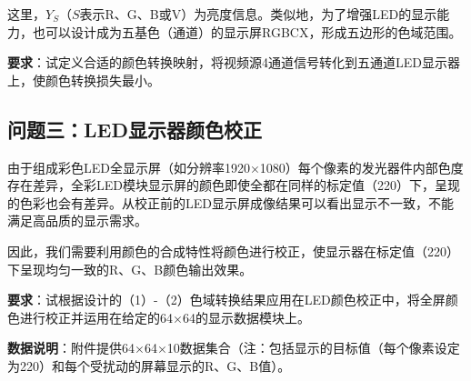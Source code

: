 这里，$Y_S$（$S$表示R、G、B或V）为亮度信息。类似地，为了增强LED的显示能力，也可以设计成为五基色（通道）的显示屏RGBCX，形成五边形的色域范围。

\textbf{要求}：试定义合适的颜色转换映射，将视频源4通道信号转化到五通道LED显示器上，使颜色转换损失最小。

\subsection[\hspace{-2pt}问题三：LED显示器颜色校正]{{\heiti{} \hspace{-8pt}问题三：LED显示器颜色校正}}\label{subsection1: 问题三}

由于组成彩色LED全显示屏（如分辨率1920×1080）每个像素的发光器件内部色度存在差异，全彩LED模块显示屏的颜色即使全都在同样的标定值（220）下，呈现的色彩也会有差异。从校正前的LED显示屏成像结果可以看出显示不一致，不能满足高品质的显示需求。

因此，我们需要利用颜色的合成特性将颜色进行校正，使显示器在标定值（220）下呈现均匀一致的R、G、B颜色输出效果。

\textbf{要求}：试根据设计的（1）-（2）色域转换结果应用在LED颜色校正中，将全屏颜色进行校正并运用在给定的64×64的显示数据模块上。

\textbf{数据说明}：附件提供64×64×10数据集合（注：包括显示的目标值（每个像素设定为220）和每个受扰动的屏幕显示的R、G、B值）。
